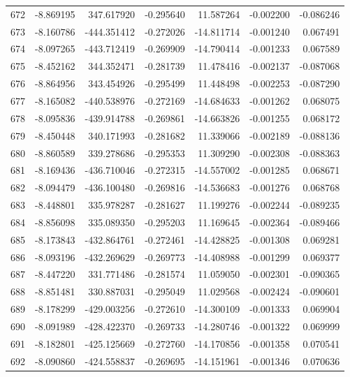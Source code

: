 \begin{tabular}{rrrrrrr}
 672 &  -8.869195 &  347.617920 & -0.295640 &  11.587264 &  -0.002200 & -0.086246 \\
 673 &  -8.160786 & -444.351412 & -0.272026 & -14.811714 &  -0.001240 &  0.067491 \\
 674 &  -8.097265 & -443.712419 & -0.269909 & -14.790414 &  -0.001233 &  0.067589 \\
 675 &  -8.452162 &  344.352471 & -0.281739 &  11.478416 &  -0.002137 & -0.087068 \\
 676 &  -8.864956 &  343.454926 & -0.295499 &  11.448498 &  -0.002253 & -0.087290 \\
 677 &  -8.165082 & -440.538976 & -0.272169 & -14.684633 &  -0.001262 &  0.068075 \\
 678 &  -8.095836 & -439.914788 & -0.269861 & -14.663826 &  -0.001255 &  0.068172 \\
 679 &  -8.450448 &  340.171993 & -0.281682 &  11.339066 &  -0.002189 & -0.088136 \\
 680 &  -8.860589 &  339.278686 & -0.295353 &  11.309290 &  -0.002308 & -0.088363 \\
 681 &  -8.169436 & -436.710046 & -0.272315 & -14.557002 &  -0.001285 &  0.068671 \\
 682 &  -8.094479 & -436.100480 & -0.269816 & -14.536683 &  -0.001276 &  0.068768 \\
 683 &  -8.448801 &  335.978287 & -0.281627 &  11.199276 &  -0.002244 & -0.089235 \\
 684 &  -8.856098 &  335.089350 & -0.295203 &  11.169645 &  -0.002364 & -0.089466 \\
 685 &  -8.173843 & -432.864761 & -0.272461 & -14.428825 &  -0.001308 &  0.069281 \\
 686 &  -8.093196 & -432.269629 & -0.269773 & -14.408988 &  -0.001299 &  0.069377 \\
 687 &  -8.447220 &  331.771486 & -0.281574 &  11.059050 &  -0.002301 & -0.090365 \\
 688 &  -8.851481 &  330.887031 & -0.295049 &  11.029568 &  -0.002424 & -0.090601 \\
 689 &  -8.178299 & -429.003256 & -0.272610 & -14.300109 &  -0.001333 &  0.069904 \\
 690 &  -8.091989 & -428.422370 & -0.269733 & -14.280746 &  -0.001322 &  0.069999 \\
 691 &  -8.182801 & -425.125669 & -0.272760 & -14.170856 &  -0.001358 &  0.070541 \\
 692 &  -8.090860 & -424.558837 & -0.269695 & -14.151961 &  -0.001346 &  0.070636 \\

\end{tabular}
